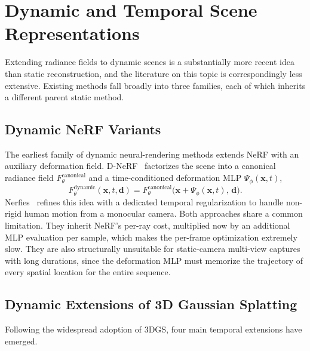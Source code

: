 \section{Dynamic and Temporal Scene Representations}
\label{sec:dynamic}

Extending radiance fields to dynamic scenes is a substantially more recent idea
than static reconstruction, and the literature on this topic is correspondingly
less extensive. Existing methods fall broadly into three families, each of which
inherits a different parent static method.

\subsection{Dynamic NeRF Variants}

The earliest family of dynamic neural-rendering methods extends NeRF with an
auxiliary deformation field. D-NeRF~\cite{pumarola2020} factorizes the scene
into a canonical radiance field $F_\theta^\text{canonical}$ and a
time-conditioned deformation MLP $\Psi_\phi(\mathbf{x}, t)$,
\begin{equation}
    F_\theta^\text{dynamic}(\mathbf{x}, t, \mathbf{d}) = F_\theta^\text{canonical}\bigl(\mathbf{x} + \Psi_\phi(\mathbf{x}, t),\, \mathbf{d}\bigr).
\end{equation}
Nerfies~\cite{park2021nerfies} refines this idea with a dedicated temporal
regularization to handle non-rigid human motion from a monocular camera. Both
approaches share a common limitation. They inherit NeRF's per-ray cost,
multiplied now by an additional MLP evaluation per sample, which makes the
per-frame optimization extremely slow. They are also structurally unsuitable for
static-camera multi-view captures with long durations, since the deformation MLP
must memorize the trajectory of every spatial location for the entire sequence.

\subsection{Dynamic Extensions of 3D Gaussian Splatting}

\noindent
Following the widespread adoption of 3DGS, four main temporal extensions have
emerged.

